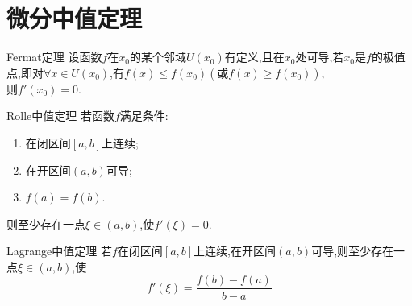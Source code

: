 \chapter{微分中值定理}

\begin{theorem}{Fermat定理} \label{thm:Fermat_theorem}
	设函数$f$在$x_0$的某个邻域$U\left( x_0 \right) $有定义,且在$x_0$处可导,若$x_0$是$f$的极值点,即对$\forall x\in  U\left( x_0 \right) $,有$f\left( x \right) \le f\left( x_0 \right) \left( \text{或}f\left( x \right) \ge f\left( x_0 \right) \right) $,\\则$f'\left( x_0 \right) =0$.
\end{theorem}

\begin{theorem}{Rolle中值定理} \label{thm:Rolle_middle_theorem}
	若函数$f$满足条件:
	\begin{enumerate}
		\item 在闭区间$\left[ a,b \right] $上连续;
		\item 在开区间$\left( a,b \right) $可导;
		\item $f\left( a \right) =f\left( b \right) $.
	\end{enumerate}
	则至少存在一点$\xi \in \left( a,b \right) $,使$f'\left( \xi \right) = 0 $.
\end{theorem}

\begin{theorem}{Lagrange中值定理} \label{thm:Lagrange_middle_theorem}
	若$f$在闭区间$\left[ a,b \right] $上连续,在开区间$\left( a,b \right) $可导,则至少存在一点$\xi \in \left( a,b \right) $,使
	$$
		f'\left( \xi \right) =\frac{f\left( b \right) -f\left( a \right)}{b-a}
	$$
\end{theorem}

